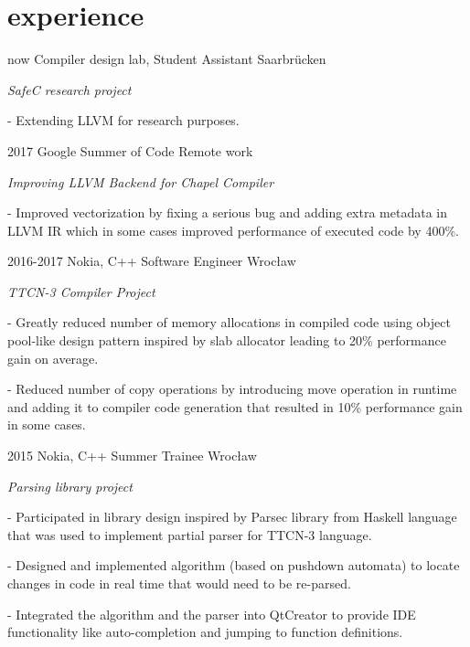 \documentclass[]{twentysecondcv}
\begin{document}

\section{experience}

\begin{twenty}
  \twentyitem
  {now}
  {Compiler design lab, Student Assistant}
  {Saarbrücken}
  {\emph{SafeC research project}
  
  - Extending LLVM for research purposes.  
  }
  \twentyitem
    {2017}
    {Google Summer of Code}
    {Remote work}
    {
    \emph{Improving LLVM Backend for Chapel Compiler}
    
    - Improved vectorization by fixing a serious bug and adding extra metadata in LLVM IR which in some cases improved performance of executed code by 400\%. 
    
    }
  \twentyitem
    {2016-2017}
    {Nokia, C++ Software Engineer}
    {Wrocław}
    {
    \emph{TTCN-3 Compiler Project}
    
     - Greatly reduced number of memory allocations in compiled code using object pool-like design pattern inspired by slab allocator leading to 20\% performance gain on average.
     
     - Reduced number of copy operations by introducing move operation in runtime and adding it to compiler code generation that resulted in 10\% performance gain in some cases. }
     
\twentyitem
    {2015}
    {Nokia, C++ Summer Trainee}
    {Wrocław}
    {
    \emph{Parsing library project}
    
    - Participated in library design inspired by Parsec library from Haskell language that was used to implement partial parser for TTCN-3 language.
    
    - Designed and implemented algorithm (based on pushdown automata) to locate changes in code in real time that would need to be re-parsed.
    
    - Integrated the algorithm and the parser into QtCreator to provide IDE functionality like auto-completion and jumping to function definitions.
    
    }

\end{twenty}
\end{document}

